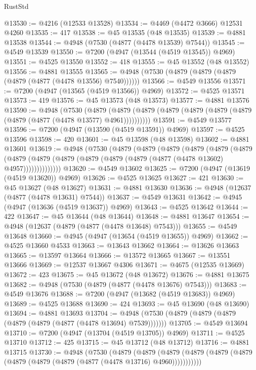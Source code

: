 \begin{lexlean}{RustStd}
\begin{coremodule}
{\begin{coremodule}
{{{{{{{{{{{{{{{{{{{{{{{{{{{{{{{{{{{{{{{{{{{{{{{{{{{{{{{{{{{{@13530 := @4216 (@12533 @13528)
@13534 := @4469 (@4472 @3666) @12531 @4260
@13535 := 417
@13538 := @45 @13535 (@48 @13535)
@13539 := @4881 @13538
@13544 := @4948 (@7530 (@4877 (@4478 @13539) @7544))
@13545 := @4549 @13539
@13550 := @7200 (@4947 (@13544 (@4519 @13545)) @4969)
@13551 := @4525 @13550
@13552 := 418
@13555 := @45 @13552 (@48 @13552)
@13556 := @4881 @13555
@13565 := @4948 (@7530 (@4879 (@4879 (@4879 (@4879 (@4877 (@4478 @13556) @7540))))))
@13566 := @4549 @13556
@13571 := @7200 (@4947 (@13565 (@4519 @13566)) @4969)
@13572 := @4525 @13571
@13573 := 419
@13576 := @45 @13573 (@48 @13573)
@13577 := @4881 @13576
@13590 := @4948
    (@7530
      (@4879 (@4879 (@4879 (@4879 (@4879 (@4879 (@4879 (@4879 (@4877 (@4478 @13577) @4961))))))))))
@13591 := @4549 @13577
@13596 := @7200 (@4947 (@13590 (@4519 @13591)) @4969)
@13597 := @4525 @13596
@13598 := 420
@13601 := @45 @13598 (@48 @13598)
@13602 := @4881 @13601
@13619 := @4948
    (@7530
      (@4879
        (@4879
          (@4879
            (@4879
              (@4879
                (@4879
                  (@4879
                    (@4879 (@4879 (@4879 (@4879 (@4879 (@4877 (@4478 @13602) @4957))))))))))))))
@13620 := @4549 @13602
@13625 := @7200 (@4947 (@13619 (@4519 @13620)) @4969)
@13626 := @4525 @13625
@13627 := 421
@13630 := @45 @13627 (@48 @13627)
@13631 := @4881 @13630
@13636 := @4948 (@12637 (@4877 (@4478 @13631) @7544))
@13637 := @4549 @13631
@13642 := @4945 (@4947 (@13636 (@4519 @13637)) @4969)
@13643 := @4525 @13642
@13644 := 422
@13647 := @45 @13644 (@48 @13644)
@13648 := @4881 @13647
@13654 := @4948 (@12637 (@4879 (@4877 (@4478 @13648) @7543)))
@13655 := @4549 @13648
@13660 := @4945 (@4947 (@13654 (@4519 @13655)) @4969)
@13662 := @4525 @13660 @4533
@13663 := @13643 @13662
@13664 := @13626 @13663
@13665 := @13597 @13664
@13666 := @13572 @13665
@13667 := @13551 @13666
@13669 := @12537 @13667 @4306
@13671 := @4675 (@12535 @13669)
@13672 := 423
@13675 := @45 @13672 (@48 @13672)
@13676 := @4881 @13675
@13682 := @4948 (@7530 (@4879 (@4877 (@4478 @13676) @7543)))
@13683 := @4549 @13676
@13688 := @7200 (@4947 (@13682 (@4519 @13683)) @4969)
@13689 := @4525 @13688
@13690 := 424
@13693 := @45 @13690 (@48 @13690)
@13694 := @4881 @13693
@13704 := @4948 (@7530 (@4879 (@4879 (@4879 (@4879 (@4879 (@4877 (@4478 @13694) @7539)))))))
@13705 := @4549 @13694
@13710 := @7200 (@4947 (@13704 (@4519 @13705)) @4969)
@13711 := @4525 @13710
@13712 := 425
@13715 := @45 @13712 (@48 @13712)
@13716 := @4881 @13715
@13730 := @4948
    (@7530
      (@4879
        (@4879
          (@4879 (@4879 (@4879 (@4879 (@4879 (@4879 (@4879 (@4877 (@4478 @13716) @4960)))))))))))
}}}}}}}}}}}}}}}}}}}}}}}}}}}}}}}}}}}}}}}}}}}}}}}}}}}}}}}}}}}}
\end{coremodule}}
\end{coremodule}
\end{lexlean}
